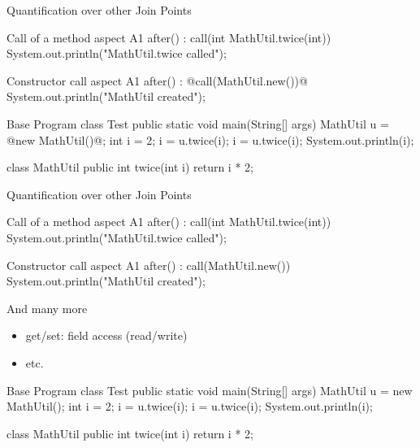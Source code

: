 \begin{frame}[fragile]{Quantification over other Join Points}
	\begin{mycolumns}[animation=none]
\begin{codetight}{Call of a method}
aspect A1 {
	after() : call(int MathUtil.twice(int)) {
		System.out.println("MathUtil.twice called");
	}
}
\end{codetight}
\begin{codetight}{Constructor call}
aspect A1 {
	after() : @call(MathUtil.new())@ {
		System.out.println("MathUtil created");
	}
}
\end{codetight}
	\mynextcolumn
\begin{codetight}{Base Program}
class Test {
	public static void main(String[] args) {
		MathUtil u = @new MathUtil()@;
		int i = 2;
		i = u.twice(i);
		i = u.twice(i);
		System.out.println(i);
	}
}

class MathUtil {
	public int twice(int i) {
		return i * 2;
	}
}
\end{codetight}	
	\end{mycolumns}
\end{frame}

\begin{frame}[fragile]{Quantification over other Join Points}
	\begin{mycolumns}[animation=none]
\begin{codetight}{Call of a method}
aspect A1 {
	after() : call(int MathUtil.twice(int)) {
		System.out.println("MathUtil.twice called");
	}
}
\end{codetight}
\begin{codetight}{Constructor call}
aspect A1 {
	after() : call(MathUtil.new()) {
		System.out.println("MathUtil created");
	}
}
\end{codetight}
		\begin{note}{And many more}
			\begin{itemize}
				\item get/set: field access (read/write)
				\item etc.
			\end{itemize}
		\end{note}
	\mynextcolumn
\begin{codetight}{Base Program}
class Test {
	public static void main(String[] args) {
		MathUtil u = new MathUtil();
		int i = 2;
		i = u.twice(i);
		i = u.twice(i);
		System.out.println(i);
	}
}

class MathUtil {
	public int twice(int i) {
		return i * 2;
	}
}
\end{codetight}	
	\end{mycolumns}
\end{frame}

